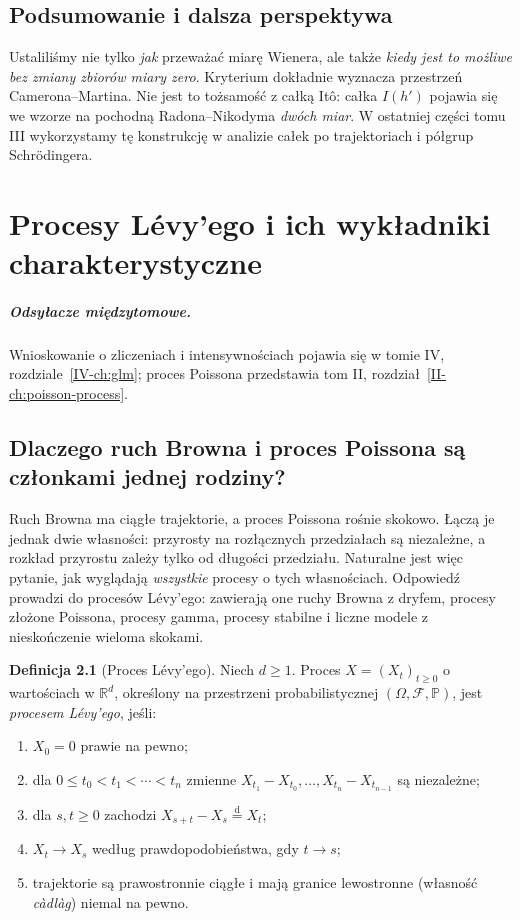 \documentclass[11pt,a4paper,oneside]{report}
\numberwithin{equation}{chapter}
\theoremstyle{plain}
\theoremstyle{definition}
\newtheorem{definicja}{Definicja}[chapter]
\theoremstyle{remark}
\newcommand{\R}{\mathbb{R}}
\newcommand{\Prob}{\mathbb{P}}
\newcommand{\calF}{\mathcal{F}}
\begin{document}
\section{Podsumowanie i dalsza perspektywa}
Ustaliliśmy nie tylko \emph{jak} przeważać miarę Wienera,
ale także \emph{kiedy jest to możliwe bez zmiany zbiorów miary zero}.
Kryterium dokładnie wyznacza przestrzeń Camerona--Martina.
Nie jest to tożsamość z całką Itô: całka $I(h')$ pojawia się
we wzorze na pochodną Radona--Nikodyma \emph{dwóch miar}.
W ostatniej części tomu III wykorzystamy tę konstrukcję
w analizie całek po trajektoriach i półgrup Schrödingera.

\chapter{Procesy Lévy'ego i ich wykładniki charakterystyczne}
\label{ch:levy}
\paragraph{Odsyłacze międzytomowe.} Wnioskowanie o zliczeniach i intensywnościach pojawia się w tomie IV, rozdziale~\ref{IV-ch:glm}; proces Poissona przedstawia tom II, rozdział~\ref{II-ch:poisson-process}.


\section{Dlaczego ruch Browna i proces Poissona są członkami jednej rodziny?}

Ruch Browna ma ciągłe trajektorie, a proces Poissona rośnie
skokowo. Łączą je jednak dwie własności: przyrosty na rozłącznych
przedziałach są niezależne, a rozkład przyrostu zależy tylko od
długości przedziału. Naturalne jest więc pytanie, jak wyglądają
\emph{wszystkie} procesy o tych własnościach.
Odpowiedź prowadzi do procesów Lévy'ego: zawierają one
ruchy Browna z dryfem, procesy złożone Poissona, procesy gamma,
procesy stabilne i liczne modele z nieskończenie wieloma skokami.

\begin{definicja}[Proces Lévy'ego]
\label{def:levy}
Niech $d\ge1$. Proces $X=(X_t)_{t\ge0}$ o wartościach w
$\R^d$, określony na przestrzeni probabilistycznej
$(\Omega,\calF,\Prob)$, jest \emph{procesem Lévy'ego}, jeśli:
\begin{enumerate}
\item $X_0=0$ prawie na pewno;
\item dla $0\le t_0<t_1<\cdots<t_n$ zmienne
$X_{t_1}-X_{t_0},\ldots,X_{t_n}-X_{t_{n-1}}$ są niezależne;
\item dla $s,t\ge0$ zachodzi
$X_{s+t}-X_s\overset{\mathrm d}=X_t$;
\item $X_t\to X_s$ według prawdopodobieństwa, gdy $t\to s$;
\item trajektorie są prawostronnie ciągłe i mają granice lewostronne
(własność \emph{càdlàg}) niemal na pewno.
\end{enumerate}
\end{definicja}
\end{document}
